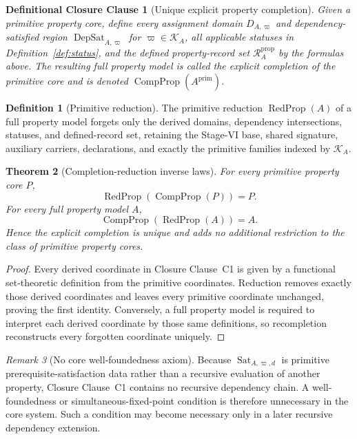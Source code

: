 \documentclass[11pt]{article}
\newcommand{\DepSat}{\operatorname{DepSat}}
\newcommand{\Sat}{\operatorname{Sat}}
\newcommand{\PropRec}{\mathcal R^{\mathrm{prop}}}
\newcommand{\CompProp}{\operatorname{CompProp}}
\newcommand{\RedProp}{\operatorname{RedProp}}
\newtheorem{closureclause}{Definitional Closure Clause}
\newtheorem{theorem}{Theorem}[section]
\theoremstyle{definition}
\newtheorem{definition}[theorem]{Definition}
\theoremstyle{remark}
\newtheorem{remark}[theorem]{Remark}
\begin{document}
\begin{closureclause}[Unique explicit property completion]
\label{cl:completion}
Given a primitive property core, define every assignment domain \(D_{A,\varpi}\) and dependency-satisfied region \(\DepSat_{A,\varpi}\) for \(\varpi\in\mathcal K_A\), all applicable statuses in Definition~\ref{def:status}, and the defined property-record set \(\PropRec_A\) by the formulas above.
The resulting full property model is called the \emph{explicit completion} of the primitive core and is denoted \(\CompProp(A^{\mathrm{prim}})\).
\end{closureclause}

\begin{definition}[Primitive reduction]
The primitive reduction \(\RedProp(A)\) of a full property model forgets only the derived domains, dependency intersections, statuses, and defined-record set, retaining the Stage-VI base, shared signature, auxiliary carriers, declarations, and exactly the primitive families indexed by \(\mathcal K_A\).
\end{definition}

\begin{theorem}[Completion-reduction inverse laws]
\label{thm:completion-inverse}
For every primitive property core \(P\),
\[
\RedProp(\CompProp(P))=P.
\]
For every full property model \(A\),
\[
\CompProp(\RedProp(A))=A.
\]
Hence the explicit completion is unique and adds no additional restriction to the class of primitive property cores.
\end{theorem}

\begin{proof}
Every derived coordinate in Closure Clause~C1 is given by a functional set-theoretic definition from the primitive coordinates.
Reduction removes exactly those derived coordinates and leaves every primitive coordinate unchanged, proving the first identity.
Conversely, a full property model is required to interpret each derived coordinate by those same definitions, so recompletion reconstructs every forgotten coordinate uniquely.
\end{proof}

\begin{remark}[No core well-foundedness axiom]
Because \(\Sat_{A,\varpi,d}\) is primitive prerequisite-satisfaction data rather than a recursive evaluation of another property, Closure Clause~C1 contains no recursive dependency chain.
A well-foundedness or simultaneous-fixed-point condition is therefore unnecessary in the core system.
Such a condition may become necessary only in a later recursive dependency extension.
\end{remark}
\end{document}
